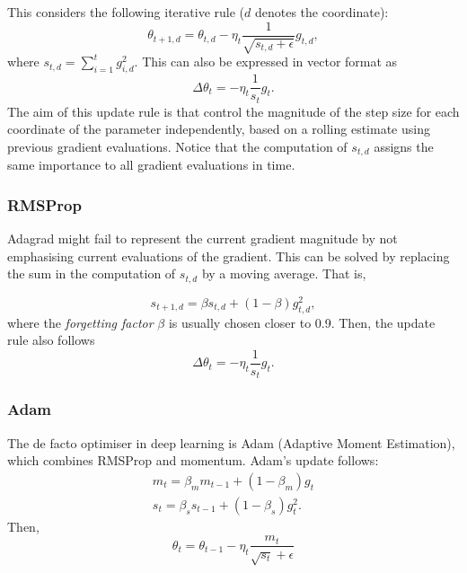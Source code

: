 This considers the following iterative rule ($d$ denotes the coordinate):  
\begin{equation}
	\theta_{t+1,d} = \theta_{t,d} - \eta_t \frac{1}{\sqrt{s_{t,d}+\epsilon}} g_{t,d},
\end{equation}
where $s_{t,d} = \sum_{i=1}^t g_{i,d}^2$. This can also be expressed in vector format as
\begin{equation}
	\Delta \theta_t = -\eta_t \frac{1}{s_t} g_t.
\end{equation}
The aim of this update rule is that control the magnitude of the step size for each coordinate of the parameter independently, based on a rolling estimate using previous gradient evaluations. Notice that the computation of $s_{t,d}$ assigns the same importance to all gradient evaluations in time.


\subsubsection{RMSProp}

Adagrad might fail to represent the current gradient magnitude by not emphasising current evaluations of the gradient. This can be solved by replacing the sum in the computation of $s_{t,d}$  by a moving average. That is, 

\begin{equation}
	s_{t+1,d} = \beta s_{t,d} + (1-\beta) g_{t,d}^2,
\end{equation}
where the \emph{forgetting factor} $\beta$ is usually chosen closer to 0.9. Then, the update rule also follows
\begin{equation}
	\Delta \theta_t = -\eta_t \frac{1}{s_t} g_t.
\end{equation}
 
\subsubsection{Adam}

The de facto optimiser in deep learning is Adam (Adaptive Moment Estimation), which combines RMSProp and momentum. Adam's update follows: 
\begin{align}
	m_t = \beta_m m_{t-1} + (1-\beta_m) g_{t}\\
	s_t = \beta_s s_{t-1} + (1-\beta_s) g^2_{t}.
\end{align}
Then, 
\begin{equation}
	\theta_{t} = \theta_{t-1} - \eta_t \frac{m_t}{\sqrt{s_t} + \epsilon}
\end{equation}


\begin{mdframed}[style=ejemplo, frametitle={\center Example: different optimisers}]
	
	
\end{mdframed}



